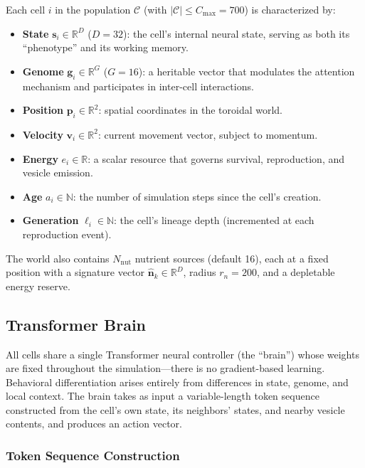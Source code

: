 \documentclass[10pt,twocolumn]{article}
\begin{document}
Each cell $i$ in the population $\mathcal{C}$ (with $|\mathcal{C}| \leq C_{\max} = 700$) is characterized by:
\begin{itemize}
  \item \textbf{State} $\mathbf{s}_i \in \mathbb{R}^{D}$ ($D = 32$): the cell's internal neural state, serving as both its ``phenotype'' and its working memory.
  \item \textbf{Genome} $\mathbf{g}_i \in \mathbb{R}^{G}$ ($G = 16$): a heritable vector that modulates the attention mechanism and participates in inter-cell interactions.
  \item \textbf{Position} $\mathbf{p}_i \in \mathbb{R}^{2}$: spatial coordinates in the toroidal world.
  \item \textbf{Velocity} $\mathbf{v}_i \in \mathbb{R}^{2}$: current movement vector, subject to momentum.
  \item \textbf{Energy} $e_i \in \mathbb{R}$: a scalar resource that governs survival, reproduction, and vesicle emission.
  \item \textbf{Age} $a_i \in \mathbb{N}$: the number of simulation steps since the cell's creation.
  \item \textbf{Generation} $\ell_i \in \mathbb{N}$: the cell's lineage depth (incremented at each reproduction event).
\end{itemize}

The world also contains $N_{\text{nut}}$ nutrient sources (default 16), each at a fixed position with a signature vector $\hat{\mathbf{n}}_k \in \mathbb{R}^D$, radius $r_n = 200$, and a depletable energy reserve.


\subsection{Transformer Brain}
\label{sec:brain}

All cells share a single Transformer neural controller (the ``brain'') whose weights are fixed throughout the simulation---there is no gradient-based learning.
Behavioral differentiation arises entirely from differences in state, genome, and local context.
The brain takes as input a variable-length token sequence constructed from the cell's own state, its neighbors' states, and nearby vesicle contents, and produces an action vector.

\subsubsection{Token Sequence Construction}
\end{document}
